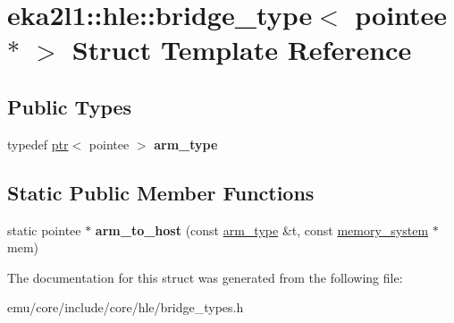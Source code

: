 \hypertarget{structeka2l1_1_1hle_1_1bridge__type_3_01pointee_01_5_01_4}{}\section{eka2l1\+:\+:hle\+:\+:bridge\+\_\+type$<$ pointee $\ast$ $>$ Struct Template Reference}
\label{structeka2l1_1_1hle_1_1bridge__type_3_01pointee_01_5_01_4}
\subsection*{Public Types}
\begin{DoxyCompactItemize}
\item 
\mbox{\label{structeka2l1_1_1hle_1_1bridge__type_3_01pointee_01_5_01_4_a220112afe6a5c3b2a3963b6f7db4e357}} 
typedef \mbox{\hyperlink{classeka2l1_1_1ptr}{ptr}}$<$ pointee $>$ {\bfseries arm\+\_\+type}
\end{DoxyCompactItemize}
\subsection*{Static Public Member Functions}
\begin{DoxyCompactItemize}
\item 
\mbox{\label{structeka2l1_1_1hle_1_1bridge__type_3_01pointee_01_5_01_4_a9209515e61b44283b5e1839deabd7acf}} 
static pointee $\ast$ {\bfseries arm\+\_\+to\+\_\+host} (const \mbox{\hyperlink{classeka2l1_1_1ptr}{arm\+\_\+type}} \&t, const \mbox{\hyperlink{classeka2l1_1_1memory__system}{memory\+\_\+system}} $\ast$mem)
\end{DoxyCompactItemize}


The documentation for this struct was generated from the following file\+:\begin{DoxyCompactItemize}
\item 
emu/core/include/core/hle/bridge\+\_\+types.\+h\end{DoxyCompactItemize}
